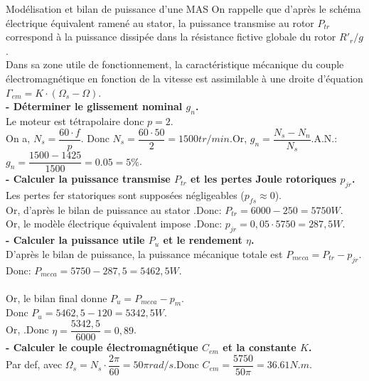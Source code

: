 \documentclass{article} %
\begin{document}
{\begin{exemple}{Modélisation et bilan de puissance d'une MAS}
On rappelle que d'après le schéma électrique équivalent ramené au stator, la puissance transmise au rotor $P_{tr}$ correspond à la puissance dissipée dans la résistance fictive globale du rotor $R'_r/g$.\\
Dans sa zone utile de fonctionnement, la caractéristique mécanique du couple électromagnétique en fonction de la vitesse est assimilable à une droite d'équation $\Gamma_{em} = K \cdot (\Omega_s - \Omega)$.\vspace*{7pt}\\
\textbf{- Déterminer le glissement nominal $g_n$.}\\
Le moteur est tétrapolaire donc $p=2$. \\
On a, $N_s = \dfrac{60 \cdot f}{p}$. Donc $N_s = \dfrac{60 \cdot 50}{2} = 1500 tr/min$.\quad Or, $g_n = \dfrac{N_s - N_n}{N_s}$.\qquad A.N.: $g_n = \dfrac{1500 - 1425}{1500} =0.05=5\%$.\vspace*{7pt}\\
\textbf{- Calculer la puissance transmise $P_{tr}$ et les pertes Joule rotoriques $p_{jr}$.}\\
Les pertes fer statoriques sont supposées négligeables ($p_{fs} \approx 0$).\\
Or, d'après le bilan de puissance au stator .\qquad Donc: $P_{tr} = 6000 - 250=5750W$.\\
Or, le modèle électrique équivalent impose .\qquad Donc: $p_{jr} = 0{,}05 \cdot 5750=287,5W$.\vspace*{7pt}\\
\textbf{- Calculer la puissance utile $P_u$ et le rendement $\eta$.}\\
D'après le bilan de puissance, la puissance mécanique totale est $P_{meca} = P_{tr} - p_{jr}$. Donc: $P_{meca} = 5750 - 287,5 = 5462,5W$.\\
\\
Or, le bilan final donne $P_u = P_{meca} - p_m$.\\
Donc $P_u = 5462,5 - 120=5342,5W$.\\
Or, .\qquad Donc $\eta = \dfrac{5342{,}5}{6000}=0,89$.\vspace*{7pt}\\
\textbf{- Calculer le couple électromagnétique $C_{em}$ et la constante $K$.}\\
Par def,  avec $\Omega_s = N_s \cdot \dfrac{2\pi}{60} = 50\pi rad/s$.\quad Donc $C_{em} = \dfrac{5750}{50\pi}=36.61 N.m$.\\

\end{exemple}}
\end{document}
